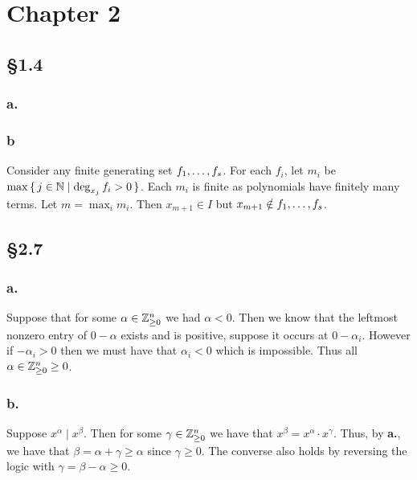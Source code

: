 \documentclass[letterpaper]{article}
\begin{document}
\clearpage

\section*{Chapter 2}

\subsection*{\S 1.4}

\subsubsection*{a.}


\subsubsection*{b}

Consider any finite generating set $\ideal{f_{1}, \ldots, f_{s}}$.
For each $f_{i}$, let $m_{i}$ be $\max\set{j \in \mathbb{N}| \deg_{x_{j}}{f_{i}} > 0}$.
Each $m_{i}$ is finite as polynomials have finitely many terms.
Let $m = \max_{i} m_{i}$.
Then $x_{m + 1} \in I$ but $x_{m + 1} \notin \ideal{f_{1}, \ldots, f_{s}}$.

\subsection*{\S 2.7}

\subsubsection*{a.}

Suppose that for some $\alpha \in \mathbb{Z}_{\geq 0}^{n}$ we had $\alpha < 0$.
Then we know that the leftmost nonzero entry of $0 - \alpha$ exists and is positive, suppose it occurs at $0 - \alpha_{i}$.
However if $-\alpha_{i} > 0$ then we must have that $\alpha_{i} < 0$ which is impossible.
Thus all $\alpha \in \mathbb{Z}_{\geq 0}^{n} \geq 0$.

\subsubsection*{b.}

Suppose $x^{\alpha} \mid x^{\beta}$.
Then for some $\gamma \in \mathbb{Z}_{\geq 0}^{n}$ we have that $x^{\beta} = x^{\alpha} \cdot x^{\gamma}$.
Thus, by \textbf{a.}, we have that $\beta = \alpha + \gamma \geq \alpha$ since $\gamma \geq 0$.
The converse also holds by reversing the logic with $\gamma = \beta - \alpha \geq 0$.
\end{document}
